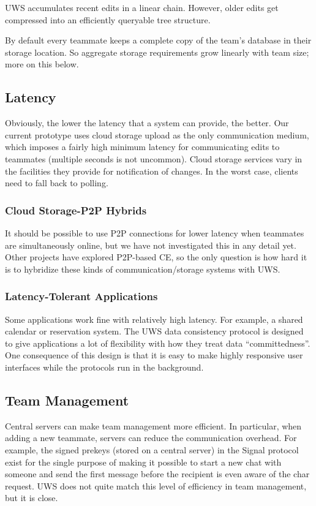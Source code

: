 \documentclass[runningheads]{llncs}
\begin{document}
UWS accumulates recent edits in a linear chain.
However, older edits get compressed into an efficiently queryable tree structure.

By default every teammate keeps a complete copy of the team's database in their storage location.
So aggregate storage requirements grow linearly with team size; more on this below.

\subsection{Latency}

Obviously, the lower the latency that a system can provide, the better.
Our current prototype uses cloud storage upload as the only communication medium, which imposes a fairly high minimum latency for communicating edits to teammates (multiple seconds is not uncommon).
Cloud storage services vary in the facilities they provide for notification of changes.
In the worst case, clients need to fall back to polling.

\subsubsection{Cloud Storage-P2P Hybrids}

It should be possible to use P2P connections for lower latency when teammates are simultaneously online, but we have not investigated this in any detail yet.
Other projects have explored P2P-based CE, so the only question is how hard it is to hybridize these kinds of communication{\slash}storage systems with UWS.

\subsubsection{Latency-Tolerant Applications}

Some applications work fine with relatively high latency.
For example, a shared calendar or reservation system.
The UWS data consistency protocol is designed to give applications a lot of flexibility with how they treat data ``committedness''.
One consequence of this design is that it is easy to make highly responsive user interfaces while the protocols run in the background.

\subsection{Team Management}

Central servers can make team management more efficient.
In particular, when adding a new teammate, servers can reduce the communication overhead.
For example, the signed prekeys (stored on a central server) in the Signal protocol exist for the single purpose of making it possible to start a new chat with someone and send the first message before the recipient is even aware of the char request.
UWS does not quite match this level of efficiency in team management, but it is close.
\end{document}
